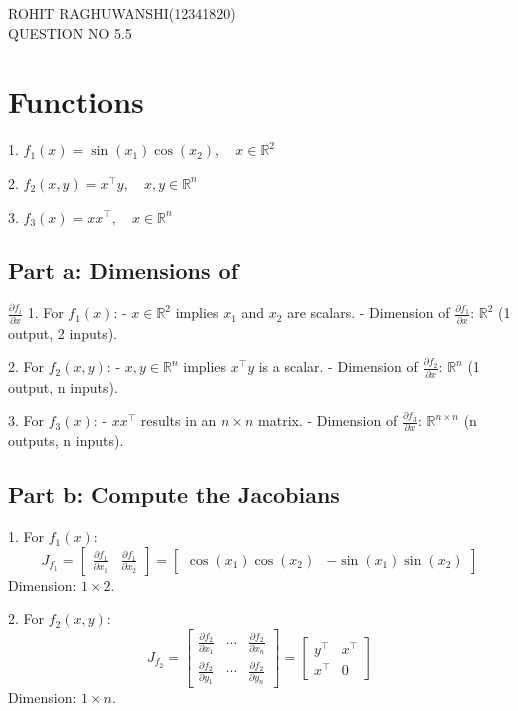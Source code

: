 \documentclass{article}
\begin{document}
\begin{center}
    
    {\Huge ROHIT RAGHUWANSHI(12341820)}\\

    {\Large QUESTION NO 5.5}\\
\end{center}

\section*{Functions}
1. \( f_1(x) = \sin(x_1) \cos(x_2), \quad x \in \mathbb{R}^2 \)

2. \( f_2(x, y) = x^{\top} y, \quad x, y \in \mathbb{R}^n \)

3. \( f_3(x) = xx^{\top}, \quad x \in \mathbb{R}^n \)

\subsection*{Part a: Dimensions of } \( \frac{\partial f_i}{\partial x} \)
1. For \( f_1(x) \): 
   - \( x \in \mathbb{R}^2 \) implies \( x_1 \) and \( x_2 \) are scalars.
   - Dimension of \( \frac{\partial f_1}{\partial x} \): \( \mathbb{R}^2 \) (1 output, 2 inputs).

2. For \( f_2(x, y) \): 
   - \( x, y \in \mathbb{R}^n \) implies \( x^{\top} y \) is a scalar.
   - Dimension of \( \frac{\partial f_2}{\partial x} \): \( \mathbb{R}^{n} \) (1 output, n inputs).

3. For \( f_3(x) \): 
   - \( xx^{\top} \) results in an \( n \times n \) matrix.
   - Dimension of \( \frac{\partial f_3}{\partial x} \): \( \mathbb{R}^{n \times n} \) (n outputs, n inputs).

\subsection*{Part b: Compute the Jacobians}
1. For \( f_1(x) \):
   \[
   J_{f_1} = \begin{bmatrix}
   \frac{\partial f_1}{\partial x_1} & \frac{\partial f_1}{\partial x_2}
   \end{bmatrix} = \begin{bmatrix}
   \cos(x_1) \cos(x_2) & -\sin(x_1) \sin(x_2)
   \end{bmatrix}
   \]
   Dimension: \( 1 \times 2 \).

2. For \( f_2(x, y) \):
   \[
   J_{f_2} = \begin{bmatrix}
   \frac{\partial f_2}{\partial x_1} & \cdots & \frac{\partial f_2}{\partial x_n} \\
   \frac{\partial f_2}{\partial y_1} & \cdots & \frac{\partial f_2}{\partial y_n}
   \end{bmatrix} = 
   \begin{bmatrix}
   y^{\top} & x^{\top} \\
   x^{\top} & 0
   \end{bmatrix}
   \]
   Dimension: \( 1 \times n \).
\end{document}
